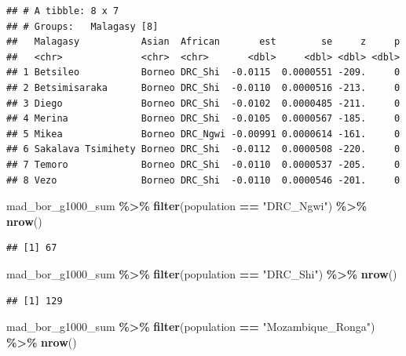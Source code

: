 \documentclass[
]{article}
\newenvironment{Shaded}{\begin{snugshade}}{\end{snugshade}}
\newcommand{\FunctionTok}[1]{\textcolor[rgb]{0.13,0.29,0.53}{\textbf{#1}}}
\newcommand{\NormalTok}[1]{#1}
\newcommand{\SpecialCharTok}[1]{\textcolor[rgb]{0.81,0.36,0.00}{\textbf{#1}}}
\newcommand{\StringTok}[1]{\textcolor[rgb]{0.31,0.60,0.02}{#1}}
\begin{document}
\begin{verbatim}
## # A tibble: 8 x 7
## # Groups:   Malagasy [8]
##   Malagasy           Asian  African       est        se     z     p
##   <chr>              <chr>  <chr>       <dbl>     <dbl> <dbl> <dbl>
## 1 Betsileo           Borneo DRC_Shi  -0.0115  0.0000551 -209.     0
## 2 Betsimisaraka      Borneo DRC_Shi  -0.0110  0.0000516 -213.     0
## 3 Diego              Borneo DRC_Shi  -0.0102  0.0000485 -211.     0
## 4 Merina             Borneo DRC_Shi  -0.0105  0.0000567 -185.     0
## 5 Mikea              Borneo DRC_Ngwi -0.00991 0.0000614 -161.     0
## 6 Sakalava Tsimihety Borneo DRC_Shi  -0.0112  0.0000508 -220.     0
## 7 Temoro             Borneo DRC_Shi  -0.0110  0.0000537 -205.     0
## 8 Vezo               Borneo DRC_Shi  -0.0110  0.0000546 -201.     0
\end{verbatim}

\begin{Shaded}
\begin{Highlighting}[]
\NormalTok{mad\_bor\_g1000\_sum }\SpecialCharTok{\%\textgreater{}\%}
  \FunctionTok{filter}\NormalTok{(population }\SpecialCharTok{==} \StringTok{"DRC\_Ngwi"}\NormalTok{) }\SpecialCharTok{\%\textgreater{}\%}
  \FunctionTok{nrow}\NormalTok{()}
\end{Highlighting}
\end{Shaded}

\begin{verbatim}
## [1] 67
\end{verbatim}

\begin{Shaded}
\begin{Highlighting}[]
\NormalTok{mad\_bor\_g1000\_sum }\SpecialCharTok{\%\textgreater{}\%}
  \FunctionTok{filter}\NormalTok{(population }\SpecialCharTok{==} \StringTok{"DRC\_Shi"}\NormalTok{) }\SpecialCharTok{\%\textgreater{}\%}
  \FunctionTok{nrow}\NormalTok{()}
\end{Highlighting}
\end{Shaded}

\begin{verbatim}
## [1] 129
\end{verbatim}

\begin{Shaded}
\begin{Highlighting}[]
\NormalTok{mad\_bor\_g1000\_sum }\SpecialCharTok{\%\textgreater{}\%}
  \FunctionTok{filter}\NormalTok{(population }\SpecialCharTok{==} \StringTok{"Mozambique\_Ronga"}\NormalTok{) }\SpecialCharTok{\%\textgreater{}\%}
  \FunctionTok{nrow}\NormalTok{()}
\end{Highlighting}
\end{Shaded}
\end{document}
